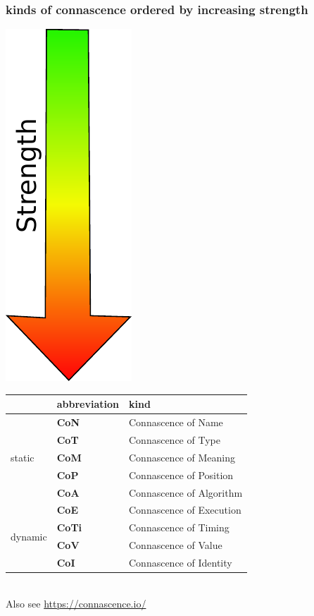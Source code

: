 \documentclass[aspectratio=169,12pt,xcolor=dvipsnames]{beamer}
\begin{document}
\begin{frame}
  \frametitle{kinds of connascence ordered by increasing strength}
  \begin{center}
    \begin{minipage}[c]{.2\textwidth}
      \includegraphics[height=.55\textheight]{arrow}
    \end{minipage}
    \begin{minipage}[c]{.75\textwidth}
      \begin{tabular}{|l|l|l|}\hline
        & \textbf{abbreviation}  & \textbf{kind} \\\hline
        \multirow{5}{*}{static}  & \textbf{CoN}  & Connascence of Name\\
        & \textbf{CoT}  & Connascence of Type\\
        & \textbf{CoM}  & Connascence of Meaning\\
        & \textbf{CoP}  & Connascence of Position\\
        & \textbf{CoA}  & Connascence of Algorithm\\\hline
        \multirow{4}{*}{dynamic} & \textbf{CoE}  & Connascence of Execution\\
        & \textbf{CoTi} & Connascence of Timing\\
        & \textbf{CoV}  & Connascence of Value\\
        & \textbf{CoI}  & Connascence of Identity\\\hline
      \end{tabular}
    \end{minipage}\\\bigskip
    Also see \url{https://connascence.io/}
  \end{center}
\end{frame}
\end{document}

